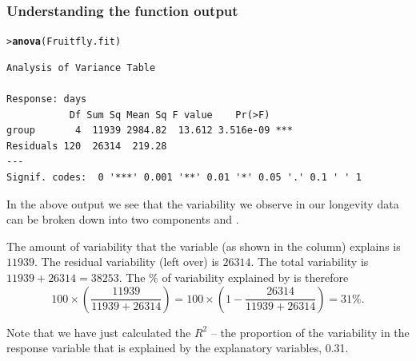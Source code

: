 \documentclass{beamer}\usepackage[]{graphicx}\usepackage[]{xcolor}
\makeatletter
\newcommand{\hlstd}[1]{\textcolor[rgb]{0.345,0.345,0.345}{#1}}%
\newcommand{\hlkwd}[1]{\textcolor[rgb]{0.737,0.353,0.396}{\textbf{#1}}}%
\newenvironment{kframe}{%
 \def\at@end@of@kframe{}%
 \ifinner\ifhmode%
  \def\at@end@of@kframe{\end{minipage}}%
  \begin{minipage}{\columnwidth}%
 \fi\fi%
 \def\FrameCommand##1{\hskip\@totalleftmargin \hskip-\fboxsep
 \colorbox{shadecolor}{##1}\hskip-\fboxsep
     \hskip-\linewidth \hskip-\@totalleftmargin \hskip\columnwidth}%
 \MakeFramed {\advance\hsize-\width
   \@totalleftmargin\z@ \linewidth\hsize
   \@setminipage}}%
 {\par\unskip\endMakeFramed%
 \at@end@of@kframe}
\newenvironment{knitrout}{}{} %
\makeatother
\begin{document}

\begin{frame}[fragile]
\frametitle{Understanding the  function output}

\begin{knitrout}\scriptsize
{}\color{fgcolor}\begin{kframe}
\begin{alltt}
\hlstd{> }\hlkwd{anova}\hlstd{(Fruitfly.fit)}
\end{alltt}
\begin{verbatim}
Analysis of Variance Table

Response: days
           Df Sum Sq Mean Sq F value    Pr(>F)    
group       4  11939 2984.82  13.612 3.516e-09 ***
Residuals 120  26314  219.28                      
---
Signif. codes:  0 '***' 0.001 '**' 0.01 '*' 0.05 '.' 0.1 ' ' 1
\end{verbatim}
\end{kframe}
\end{knitrout}

In the above output we see that the variability we observe in our longevity data can be broken down into two components  and .
\medskip

The amount of variability that the variable  (as shown in the  column) explains is $11939$.  
The residual variability (left over) is $26314$. 
The total variability is $11939+26314=38253$. 
The \% of variability explained by  is therefore
{\scriptsize
\[
100\times \left(\frac{11939}{11939+26314}\right) =100\times \left(1-\frac{26314}{11939+26314}\right)=31 \%.
\] }

Note that we have just calculated the $R^2$ -- the proportion of the variability in the response variable that is explained by the explanatory variables, 0.31.

\end{frame}
\end{document}
